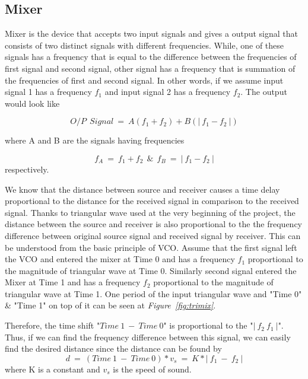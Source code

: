 \documentclass[paper]{IEEEtran}
\begin{document}

	
	
\subsection{Mixer}
	
	Mixer is the device that accepts two input signals and gives a output signal that consists of two distinct signals with different frequencies. While, one of these signals has a frequency that is equal to the difference between the frequencies of first signal and second signal, other signal has a frequency that is summation of the frequencies of first and second signal. In other words, if we assume input signal 1 has a frequency $f_1$ and input signal 2 has a frequency $f_2$. The output would look like  
	
	$$ O/P~~ Signal ~=~ A(f_1+f_2) + B(|~f_1 -f_2~|)  $$
	
	where A and B are the signals having frequencies  
	
	$$ f_A ~= ~ f_1+f_2~~ \&~~ f_B~=~|~f_1 -f_2~| $$ respectively.
	
	We know that the distance between source and receiver causes a time delay proportional to the distance for the received signal in comparison to the received signal. Thanks to triangular wave used at the very beginning of the project, the distance between the source and receiver is also proportional to the the frequency difference between original source signal and received signal by receiver. This can be understood from the basic principle of VCO. Assume that the first signal left the VCO and entered the mixer at Time 0 and has a frequency $f_1$ proportional to the magnitude of triangular wave at Time 0. Similarly second signal entered the Mixer at Time 1 and has a frequency $f_2$ proportional to the magnitude of triangular wave at Time 1. One period of the input triangular wave and "Time 0" \& "Time 1" on top of it can be seen at \textit{Figure~\ref{fig:trimix}}. 
	
	Therefore, the time shift "$Time~1~-~Time~0$" is proportional to the "$|~f_2~f_1~|$". Thus, if we can find the frequency difference between this signal, we can easily find the desired distance since the distance can be found by
	$$ d~=~(Time~1~-~Time~0)*v_s~=~K*|~f_1~-~f_2~|$$ 
	where K is a constant and $v_s$ is the speed of sound.
	
\end{document}
